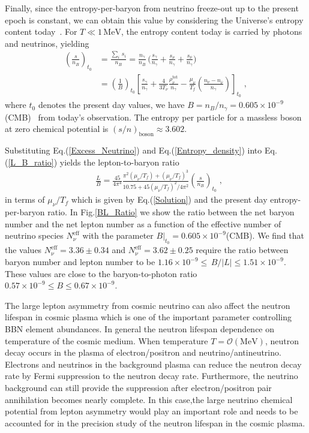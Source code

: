 Finally, since the entropy-per-baryon from neutrino freeze-out up to the present epoch is constant, we can obtain this value by considering the Universe's entropy content today~\cite{Fromerth:2012fe}. For $T\ll1\,\mathrm{MeV}$, the entropy content today is carried by photons and neutrinos, yielding
\begin{align}
\label{Nb_S}
\left(\frac{s}{n_B}\right)_{t_0}&=\frac{\sum_i\,s_i}{n_B}=\frac{n_\gamma}{n_B}\,\bigg(\frac{s_\gamma}{n_\gamma}+\frac{s_\nu}{n_\gamma}+\frac{s_{\bar{\nu}}}{n_\gamma}\bigg)\;\\
&=\left(\frac{1}{B}\right)_{\!\!t_0}\!\!\left[\frac{s_\gamma}{n_\gamma}+\frac{4}{3T_\nu}\frac{\rho_\nu^{\mathrm{tot}}}{n_\gamma}-\frac{\mu_\nu}{T_f}\left(\frac{n_\nu-n_{\bar{\nu}}}{n_\gamma}\right)\right]_{t_0}\;,
\end{align}
where $t_0$ denotes the present day values, we have $B=n_B/n_\gamma= 0.605\times10^{-9}$ (CMB)~\cite{ParticleDataGroup:2016lqr} from today's observation. The entropy per particle for a massless boson at zero chemical potential is $(s/n)_{\mathrm{boson}}\approx 3.602$.

Substituting Eq.\;(\ref{Excess_Neutrino}) and Eq.\;(\ref{Entropy_density}) into Eq.\;(\ref{L_B_ratio}) yields the lepton-to-baryon ratio
\begin{align}\label{L_B_ratio_final}
&\frac{L}{B}=\frac{45}{4\pi^4}\frac{\pi^2(\mu_\nu/T_f)+(\mu_\nu/T_f)^3}{10.75+{45}(\mu_\nu/T_f)^2/{4\pi^2}}\left(\frac{s}{n_B}\right)_{\!\!t_0}\;,
\end{align}
in terms of $\mu_\nu/T_f$ which is given by Eq.(\ref{Solution}) and the present day entropy-per-baryon ratio. In Fig.\;\ref{BL_Ratio} we show the ratio between the net baryon number and the net lepton number as a function of the effective number of neutrino species $N^{\mathrm{eff}}_\nu$ with the parameter $ B|_{t_0} =0.605\times 10^{-9}$(CMB). We find that the values $N_\nu^{\mathrm{eff}}=3.36\pm0.34$ and $N_\nu^{\mathrm{eff}}= 3.62\pm0.25$ require the ratio between baryon number and lepton number to be $1.16 \times 10^{-9} \leqslant\, B/|L| \leqslant 1.51\times 10^{-9}$. These values are close to the baryon-to-photon ratio $0.57 \times 10^{-9} \leqslant B  \leqslant 0.67\times 10^{-9}$. 


The large lepton asymmetry from cosmic neutrino can also affect the neutron lifespan in cosmic plasma which is one of the important parameter controlling BBN element abundances. 
In general the neutron lifespan dependence on temperature of the cosmic medium. When temperature $T=\mathcal{O}(\mathrm{MeV})$, neutron decay occurs in the plasma of electron/positron and 
 neutrino/antineutrino. Electrons and neutrinos in the background plasma can reduce the neutron decay rate by Fermi suppression to the neutron decay rate. Furthermore, the neutrino background can still provide the suppression after electron/positron pair annihilation becomes nearly complete. In this case,the large neutrino chemical potential from lepton asymmetry would play an important role and needs to be accounted for in the precision study of the neutron lifespan in the cosmic plasma.

